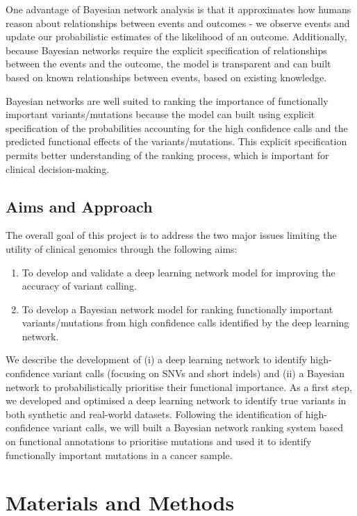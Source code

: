 \documentclass{article}
\begin{document}
One advantage of Bayesian network analysis is that it approximates how humans reason about relationships between events and outcomes - we observe events and update our probabilistic estimates of the likelihood of an outcome. Additionally, because Bayesian networks require the explicit specification of relationships between the events and the outcome, the model is transparent and can built based on known relationships between events, based on existing knowledge.

Bayesian networks are well suited to ranking the importance of functionally important variants/mutations because the model can built using explicit specification of the probabilities accounting for the high confidence calls and the predicted functional effects of the variants/mutations. This explicit specification permits better understanding of the ranking process, which is important for clinical decision-making.
\subsection{Aims and Approach}
The overall goal of this project is to address the two major issues limiting the utility of clinical genomics through the following aims:
\begin{enumerate} 
	\item To develop and validate a deep learning network model for improving the accuracy of variant calling.
	\item To develop a Bayesian network model for ranking functionally important variants/mutations from high confidence calls identified by the deep learning network.
\end{enumerate}

 We describe the development of (i) a deep learning network to identify high-confidence variant calls (focusing on SNVs and short indels) and (ii) a Bayesian network to probabilistically prioritise their functional importance. As a first step, we developed and optimised a deep learning network to identify true variants in both synthetic and real-world datasets. Following the identification of high-confidence variant calls, we will built a Bayesian network ranking system based on functional annotations to prioritise mutations and used it to identify functionally important mutations in a cancer sample.
\newpage
\section{Materials and Methods}
\end{document}
